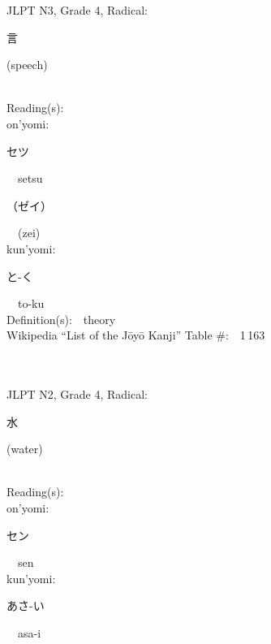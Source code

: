 \begin{multicols}{2}
{JLPT N3, Grade 4, Radical:\ \ {\begin{CJK}{UTF8}{min} 言 \end{CJK}} (speech) } \\
Reading(s):\ \ \\
{\hspace*{1em}}on'yomi:\ \ \\
{\hspace*{2em}}{\begin{CJK}{UTF8}{min} セツ \end{CJK}}\ \ setsu\ \ \\
{\hspace*{2em}}{\begin{CJK}{UTF8}{min} （ゼイ） \end{CJK}}\ \ (zei)\ \ \\
{\hspace*{1em}}kun'yomi:\ \ \\
{\hspace*{2em}}{\begin{CJK}{UTF8}{min} と-く \end{CJK}}\ \ to-ku\ \ \\
Definition(s):\ \ theory \\
Wikipedia ``List of the J\=oy\=o Kanji'' Table \#:\ \ 1\,163 \\
\ \ \\
{\fontsize{34pt}{40pt}  }\ \ \\  %
{JLPT N2, Grade 4, Radical:\ \ {\begin{CJK}{UTF8}{min} 水 \end{CJK}} (water) } \\
Reading(s):\ \ \\
{\hspace*{1em}}on'yomi:\ \ \\
{\hspace*{2em}}{\begin{CJK}{UTF8}{min} セン \end{CJK}}\ \ sen\ \ \\
{\hspace*{1em}}kun'yomi:\ \ \\
{\hspace*{2em}}{\begin{CJK}{UTF8}{min} あさ-い \end{CJK}}\ \ asa-i\ \ \\

\end{multicols}
